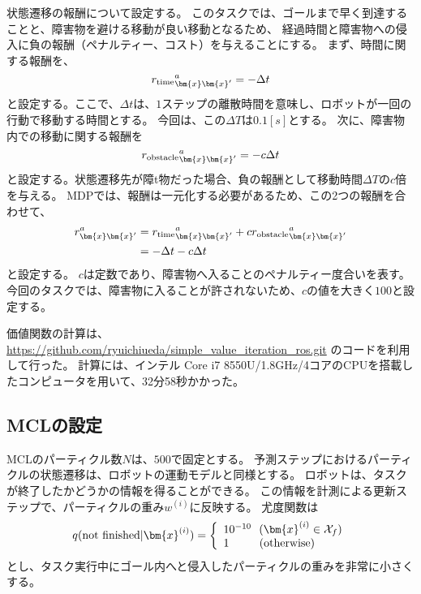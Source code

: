 状態遷移の報酬について設定する。
このタスクでは、ゴールまで早く到達することと、障害物を避ける移動が良い移動となるため、
経過時間と障害物への侵入に負の報酬（ペナルティー、コスト）を与えることにする。
まず、時間に関する報酬を、
\begin{equation}
\label{robot initial pose}
  {r_{\rm time}}^{a}_{\bm{x}\bm{x}^{\prime}} = -\Delta t
\end{equation}
と設定する。ここで、$\Delta t$は、$1$ステップの離散時間を意味し、ロボットが一回の行動で移動する時間とする。
今回は、この$\Delta T$は$0.1[s]$とする。
次に、障害物内での移動に関する報酬を
\begin{equation}
\label{robot initial pose}
  {r_{\rm obstacle}}^{a}_{\bm{x}\bm{x}^{\prime}} = -c\Delta t
\end{equation}
と設定する。状態遷移先が障t物だった場合、負の報酬として移動時間$\Delta T$の$c$倍を与える。
MDPでは、報酬は一元化する必要があるため、この2つの報酬を合わせて、
\begin{equation}
\label{robot initial pose}
\begin{split}
  r^{a}_{\bm{x}\bm{x}^{\prime}} &=
  {r_{\rm time}}^{a}_{\bm{x}\bm{x}^{\prime}} +
  c{r_{\rm obstacle}}^{a}_{\bm{x}\bm{x}^{\prime}} \\
  &= -\Delta t  -c\Delta t
\end{split}
\end{equation}
と設定する。
$c$は定数であり、障害物へ入ることのペナルティー度合いを表す。
今回のタスクでは、障害物に入ることが許されないため、$c$の値を大きく$100$と設定する。

価値関数の計算は、
\url{https://github.com/ryuichiueda/simple_value_iteration_ros.git}
のコードを利用して行った。
計算には、インテル Core i7 8550U/1.8GHz/4コアのCPUを搭載したコンピュータを用いて、32分58秒かかった。

\subsection{MCLの設定}
MCLのパーティクル数$N$は、$500$で固定とする。
予測ステップにおけるパーティクルの状態遷移は、ロボットの運動モデルと同様とする。
ロボットは、タスクが終了したかどうかの情報を得ることができる。
この情報を計測による更新ステップで、パーティクルの重み$w^{(i)}$に反映する。
尤度関数は
\begin{equation}
  q({\rm not \  finished} | \bm{x}^{(i)}) =
  \left\{
    \begin{array}{l}
      10^{-10} \ \ (\bm{x}^{(i)} \in \mathcal{X}_{f}) \\
      1 \quad \quad \ \ ({\rm otherwise})
    \end{array}
  \right.
\end{equation}
とし、タスク実行中にゴール内へと侵入したパーティクルの重みを非常に小さくする。

